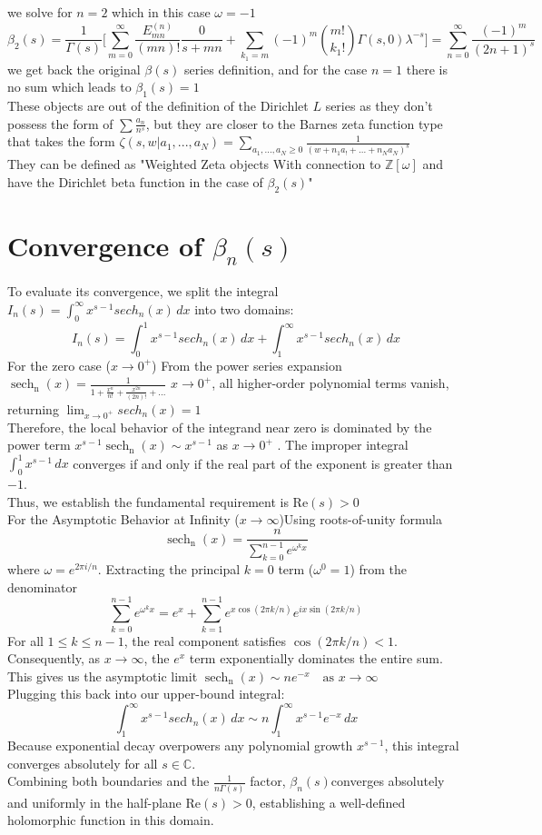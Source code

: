 \documentclass{article}
\DeclareMathOperator{\sech}{sech}
\newcommand{\NotDefinedsech}[2]{\operatorname{\sech_{#1}\text{#2}}}
\begin{document}
we solve for $n = 2$ which in this case $\omega = -1$
\[\beta_2 (s) = \frac{1}{\Gamma(s)} \bigg[ \sum_{m=0}^{\infty} \frac{E^{(n)}_{mn}}{(mn)!} \frac{0}{s+mn}+\sum_{k_1 = m}(-1)^m \binom{m!}{k_1!}\Gamma(s,0)\lambda^{-s}\bigg] = \sum_{n=0}^{\infty}\frac{(-1)^m}{(2n+1)^s}\]
we get back the original $\beta(s)$ series definition, and for the case $n=1$ there is no sum which leads to $\beta_1(s) = 1$\\
These objects are out of the definition of the Dirichlet $L$ series as they don't possess the form of $\sum \frac{a_n}{n^s}$, but they are closer to the Barnes zeta function type that takes the form $\zeta(s,w|a_1,...,a_N) = \sum_{a_1,...,a_N\geq 0}\frac{1}{(w+n_1a_!+...+n_Na_N)^s}$\\
They can be defined as "Weighted Zeta objects With connection to $\mathbb{Z}[\omega]$ and have the Dirichlet beta function in the case of $\beta_2(s)$"
\section{Convergence of $\beta_n(s)$}
To evaluate its convergence, we split the integral $I_n(s) = \int_0^\infty x^{s-1} sech_n(x) \, dx$ into two domains:
\[I_n(s) = \int_0^1 x^{s-1} sech_n(x) \, dx + \int_1^\infty x^{s-1} sech_n(x) \, dx\]
For the zero case ($x \to 0^+$) From the power series expansion\\
$\NotDefinedsech{n}{}(x)= \frac{1}{1 + \frac{x^n}{n!} + \frac{x^{2n}}{(2n)!} +...}$  $x \to 0^+$, all higher-order polynomial terms vanish, returning $\lim_{x \to 0^+} sech_n(x) = 1$\\
Therefore, the local behavior of the integrand near zero is dominated by the power term $x^{s-1} \NotDefinedsech{n}{}(x) \sim x^{s-1}$ as $ x \to 0^+$ . The improper integral $\int_0^1 x^{s-1} \, dx$ converges if and only if the real part of the exponent is greater than $-1$. \\
Thus, we establish the fundamental requirement is Re$(s)> 0$\\
For the Asymptotic Behavior at Infinity ($x \to \infty$)Using roots-of-unity formula
\[\NotDefinedsech{n}{}(x) = \frac{n}{\sum_{k=0}^{n-1} e^{\omega^k x}}\]
where $\omega = e^{2\pi i / n}$. Extracting the principal $k=0$ term ($\omega^0 = 1$) from the denominator
\[\sum_{k=0}^{n-1} e^{\omega^k x} = e^x + \sum_{k=1}^{n-1} e^{x \cos(2\pi k / n)} e^{i x \sin(2\pi k / n)}\]
For all $1 \le k \le n-1$, the real component satisfies $\cos(2\pi k / n) < 1$. Consequently, as $x \to \infty$, the $e^x$ term exponentially dominates the entire sum.\\
This gives us the asymptotic limit $\NotDefinedsech{n}{}(x) \sim n e^{-x} \quad \text{as } x \to \infty$\\
Plugging this back into our upper-bound integral:
\[\int_1^\infty x^{s-1} sech_n(x) \, dx \sim n \int_1^\infty x^{s-1} e^{-x} \, dx\]
Because exponential decay overpowers any polynomial growth $x^{s-1}$, this integral converges absolutely for all $s \in \mathbb{C}$.\\
Combining both boundaries and the $\frac{1}{n\Gamma(s)}$ factor, $\beta_n(s)$converges absolutely and uniformly in the half-plane Re$(s) > 0$, establishing a well-defined holomorphic function in this domain.
\end{document}
